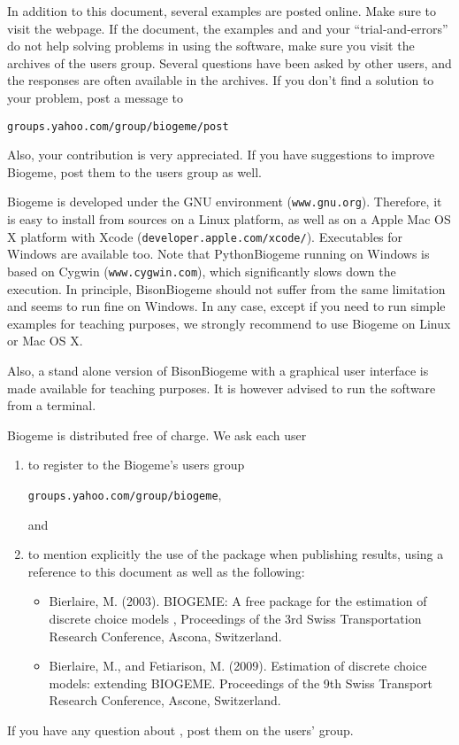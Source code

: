 \documentclass[12pt]{memoir}
\begin{document}
In addition to this document, several examples are posted online. Make sure to visit the webpage.  If the
document, the examples and and your ``trial-and-errors'' do not help solving problems in
using the software, make sure you visit the archives of the users
group. Several questions have been asked by other users, and the responses are often available in the archives.  If you don't find a solution to your problem, post a message
to
\begin{center}
\texttt{groups.yahoo.com/group/biogeme/post}
\end{center}
  Also, your contribution is very appreciated. If you have suggestions to improve Biogeme, 
  post them to the users group as well.

  Biogeme is developed under the GNU environment
  (\texttt{www.gnu.org}). Therefore, it is easy to install from
  sources on a Linux platform, as well as on a Apple Mac OS X platform
  with Xcode (\texttt{developer.apple.com/xcode/}). Executables for
  Windows are available too. Note that PythonBiogeme running on
  Windows is based on Cygwin (\texttt{www.cygwin.com}), which
  significantly slows down the execution. In principle, BisonBiogeme
  should not suffer from the same limitation and seems to run fine on
  Windows.  In any case, except if you need to run simple examples for
  teaching purposes, we strongly recommend to use Biogeme on Linux or
  Mac OS X.

 Also, a stand alone version of BisonBiogeme with a graphical user
 interface is made available for teaching purposes. It is however
 advised to run the software from a terminal.

Biogeme is distributed free of charge. We ask each user 
\begin{enumerate}
\item  to register to the Biogeme's users group 
\begin{center}
\texttt{groups.yahoo.com/group/biogeme},
\end{center}
and
\item to mention explicitly the use of the package when publishing results, using a reference to this document as well as the following:
\begin{itemize}
\item Bierlaire, M. (2003). BIOGEME: A free package for the estimation of discrete choice models , Proceedings of the 3rd Swiss Transportation Research Conference, Ascona, Switzerland. 
\item Bierlaire, M., and Fetiarison, M. (2009). Estimation of discrete choice models: extending BIOGEME. Proceedings of the 9th Swiss Transport Research Conference, Ascone, Switzerland.
\end{itemize}
\end{enumerate}
If you have any question about \BIOGEME, post them on the users' group.  
\end{document}
